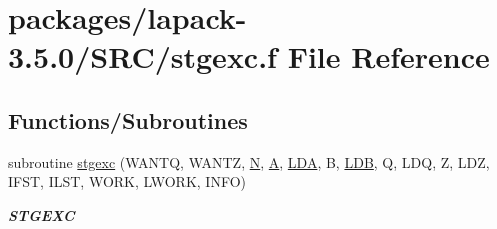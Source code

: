 \hypertarget{stgexc_8f}{}\section{packages/lapack-\/3.5.0/\+S\+R\+C/stgexc.f File Reference}
\label{stgexc_8f}
\subsection*{Functions/\+Subroutines}
\begin{DoxyCompactItemize}
\item 
subroutine \hyperlink{group__realGEcomputational_ga1af98b467b76dca2231f57debae966c5}{stgexc} (W\+A\+N\+T\+Q, W\+A\+N\+T\+Z, \hyperlink{polmisc_8c_a0240ac851181b84ac374872dc5434ee4}{N}, \hyperlink{classA}{A}, \hyperlink{example__user_8c_ae946da542ce0db94dced19b2ecefd1aa}{L\+D\+A}, B, \hyperlink{example__user_8c_a50e90a7104df172b5a89a06c47fcca04}{L\+D\+B}, Q, L\+D\+Q, Z, L\+D\+Z, I\+F\+S\+T, I\+L\+S\+T, W\+O\+R\+K, L\+W\+O\+R\+K, I\+N\+F\+O)
\begin{DoxyCompactList}\small\item\em {\bfseries S\+T\+G\+E\+X\+C} \end{DoxyCompactList}\end{DoxyCompactItemize}
